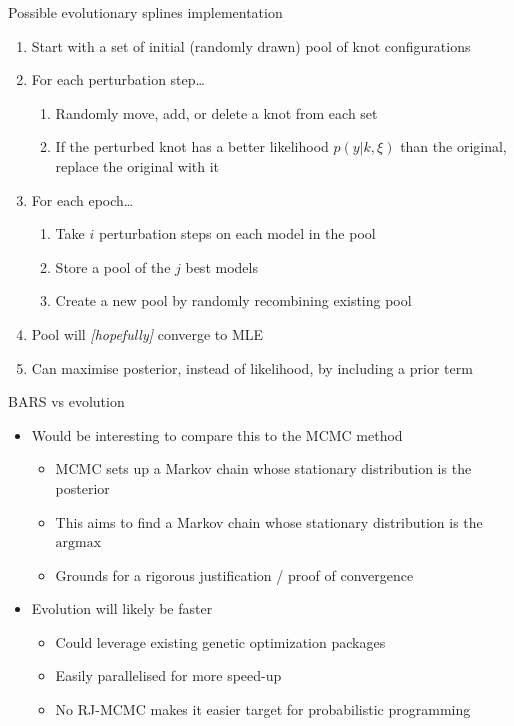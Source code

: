 \documentclass[presentation]{beamer}
\begin{document}
\begin{frame}[label={sec:orgee29cb4}]{Possible evolutionary splines implementation}
\begin{enumerate}[<+->]
\item Start with a set of initial (randomly drawn) pool of knot configurations
\item For each perturbation step\ldots{}
\begin{enumerate}
\item Randomly move, add, or delete a knot from each set
\item If the perturbed knot has a better likelihood \(p(y | k, \xi)\) than the original, replace the original with it
\end{enumerate}
\item For each epoch\ldots{}
\begin{enumerate}
\item Take \(i\) perturbation steps on each model in the pool
\item Store a pool of the \(j\) best models
\item Create a new pool by randomly recombining existing pool
\end{enumerate}
\item Pool will \emph{[hopefully]} converge to MLE
\item Can maximise posterior, instead of likelihood, by including a prior term
\end{enumerate}
\end{frame}

\begin{frame}[label={sec:org614715a}]{BARS vs evolution}
\begin{itemize}
\item Would be interesting to compare this to the MCMC method
\begin{itemize}
\item MCMC sets up a Markov chain whose stationary distribution is the posterior
\item This aims to find a Markov chain whose stationary distribution is the \(\mathrm{argmax}\)
\item Grounds for a rigorous justification / proof of convergence
\end{itemize}
\end{itemize}
\vfill
\begin{itemize}
\item Evolution will likely be faster
\begin{itemize}
\item Could leverage existing genetic optimization packages
\item Easily parallelised for more speed-up
\item No RJ-MCMC makes it easier target for probabilistic programming
\end{itemize}
\end{itemize}
\end{frame}
\end{document}
